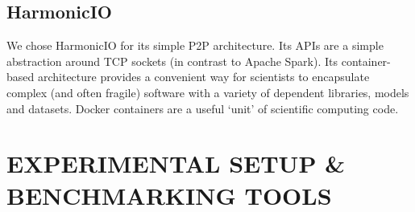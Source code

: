 \documentclass[conference]{IEEEtran}
\begin{document}


\subsection{HarmonicIO}
We chose HarmonicIO for its simple P2P architecture. Its APIs are a simple abstraction around TCP sockets (in contrast to Apache Spark). Its container-based architecture provides a convenient way for scientists to encapsulate complex (and often fragile) software with a variety of dependent libraries, models and datasets. Docker containers are a useful `unit' of scientific computing code.%




\section{EXPERIMENTAL SETUP \& BENCHMARKING TOOLS}\label{expsetup}
\end{document}
